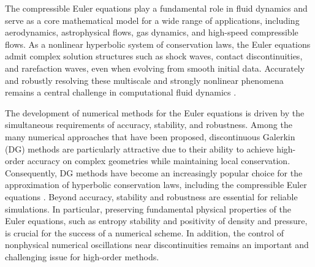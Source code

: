 \documentclass[fleqn,11pt]{amsart}
\begin{document}
The compressible Euler equations play a fundamental role in fluid dynamics and serve as a core mathematical model for a wide range of applications, including aerodynamics, astrophysical flows, gas dynamics, and high-speed compressible flows. As a nonlinear hyperbolic system of conservation laws, the Euler equations admit complex solution structures such as shock waves, contact
discontinuities, and rarefaction waves, even when evolving from smooth initial data. Accurately and robustly resolving these multiscale and strongly nonlinear phenomena remains a central challenge in computational fluid dynamics \cite{abgrall_shu_2016_hyperbolic, abgrall_shu_2017_hyperbolic_applied}.

The development of numerical methods for the Euler equations is driven by the simultaneous requirements of accuracy, stability, and robustness. Among the many numerical approaches that have been proposed, discontinuous
Galerkin (DG) methods are particularly attractive due to their ability to achieve high-order accuracy on complex geometries while maintaining local conservation.
Consequently, DG methods have become an increasingly popular choice for the approximation of hyperbolic conservation laws, including the compressible
Euler equations \cite{cockburn1989tvb}. Beyond accuracy, stability and robustness are essential for reliable
simulations. In particular, preserving fundamental physical properties of the Euler equations, such as entropy stability and positivity of density and pressure,
is crucial for the success of a numerical scheme.
In addition, the control of nonphysical numerical oscillations near discontinuities remains an important and challenging issue for high-order methods.


\end{document}
